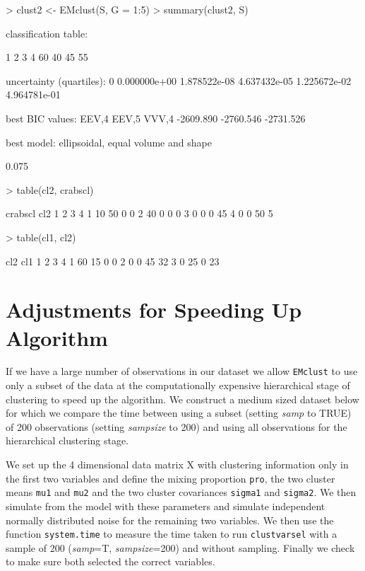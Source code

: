 \documentclass[,12pt]{article}
\newcommand{\Robject}[1]{{\texttt{#1}}}
\newcommand{\Rfunction}[1]{{\texttt{#1}}}
\newcommand{\Rfunarg}[1]{{\textit{#1}}}
\begin{document}
\begin{Schunk}
\begin{Sinput}
> clust2 <- EMclust(S, G = 1:5)
> summary(clust2, S)
\end{Sinput}
\begin{Soutput}
classification table:

 1  2  3  4 
60 40 45 55 

uncertainty (quartiles):
          0%
0.000000e+00 1.878522e-08 4.637432e-05 1.225672e-02 4.964781e-01 

best BIC values:
    EEV,4     EEV,5     VVV,4 
-2609.890 -2760.546 -2731.526 

best model: ellipsoidal, equal volume and shape 
\end{Soutput}
\begin{Soutput}
[1] 0.075
\end{Soutput}
\begin{Sinput}
> table(cl2, crabscl)
\end{Sinput}
\begin{Soutput}
   crabscl
cl2  1  2  3  4
  1 10 50  0  0
  2 40  0  0  0
  3  0  0  0 45
  4  0  0 50  5
\end{Soutput}
\begin{Sinput}
> table(cl1, cl2)
\end{Sinput}
\begin{Soutput}
   cl2
cl1  1  2  3  4
  1 60 15  0  0
  2  0  0 45 32
  3  0 25  0 23
\end{Soutput}
\end{Schunk}
\section{Adjustments for Speeding Up Algorithm}
If we have a large number of observations in our dataset we allow \Rfunction{EMclust} to use only a subset of the data at the computationally expensive hierarchical stage of clustering to speed up the algorithm. We construct a medium sized dataset below for which we compare the time between using a subset (setting \Rfunarg{samp} to TRUE) of 200 observations (setting \Rfunarg{sampsize} to 200) and using all observations for the hierarchical clustering stage.

We set up the 4 dimensional data matrix X with clustering information only in the first two variables and define the mixing proportion \Robject{pro}, the two cluster means \Robject{mu1} and \Robject{mu2} and the two cluster covariances \Robject{sigma1} and \Robject{sigma2}. We then simulate from the model with these parameters and simulate independent normally distributed noise for the remaining two variables. We then use the function \Rfunction{system.time} to measure the time taken to run \Rfunction{clustvarsel} with a sample of 200 (\Rfunarg{samp}=T, \Rfunarg{sampsize}=200) and without sampling. Finally we check to make sure both selected the correct variables.
\end{document}
